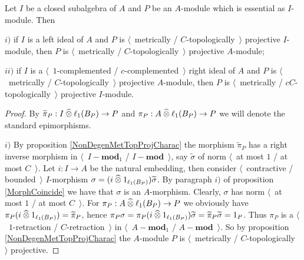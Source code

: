 \begin{proposition}\label{MetTopProjUnderChangeOfAlg} Let $I$ be a closed subalgebra of $A$ and $P$ be an $A$-module which is essential as $I$-module. Then

$i)$ if $I$ is a left ideal of $A$ and $P$ is $\langle$~metrically / $C$-topologically~$\rangle$  projective $I$-module, then $P$ is $\langle$~metrically / $C$-topologically~$\rangle$ projective $A$-module;

$ii)$ if $I$ is a $\langle$~$1$-complemented / $c$-complemented~$\rangle$ right ideal of $A$ and $P$ is $\langle$~metrically / $C$-topologically~$\rangle$ projective $A$-module, then $P$ is $\langle$~metrically / $cC$-topologically~$\rangle$ projective $I$-module.
\end{proposition}
\begin{proof} By $\widetilde{\pi}_P: I\mathbin{\widehat{\otimes}} \ell_1(B_P)\to P$ and $\pi_P:A\mathbin{\widehat{\otimes}} \ell_1(B_P)\to P$ we will denote the standard epimorphisms.

$i)$ By proposition \ref{NonDegenMetTopProjCharac} the morphism $\widetilde{\pi}_P$ has a right inverse morphism in $\langle$~$I-\mathbf{mod}_1$ / $I-\mathbf{mod}$~$\rangle$, say $\widetilde{\sigma}$ of norm $\langle$~at most $1$ / at most $C$~$\rangle$. Let $i:I\to A$ be the natural embedding, then consider $\langle$~contractive / bounded~$\rangle$ $I$-morphism $\sigma=(i\mathbin{\widehat{\otimes}} 1_{\ell_1(B_P)})\widetilde{\sigma}$. By paragraph $i)$ of proposition \ref{MorphCoincide} we have that $\sigma$ is an $A$-morphism. Clearly, $\sigma$ has norm $\langle$~at most $1$ / at most $C$~$\rangle$. For $\pi_P:A\mathbin{\widehat{\otimes}} \ell_1(B_P)\to P$ we obviously have $\pi_P(i\mathbin{\widehat{\otimes}} 1_{\ell_1(B_P)})=\widetilde{\pi}_P$, hence $\pi_P\sigma=\pi_P(i\mathbin{\widehat{\otimes}} 1_{\ell_1(B_P)})\widetilde{\sigma}=\widetilde{\pi}_P\widetilde{\sigma}=1_P$. Thus $\pi_P$ is a $\langle$~$1$-retraction / $C$-retraction~$\rangle$ in $\langle$~$A-\mathbf{mod}_1$ / $A-\mathbf{mod}$~$\rangle$. So by proposition \ref{NonDegenMetTopProjCharac} the $A$-module $P$ is $\langle$~metrically / $C$-topologically~$\rangle$ projective.


\end{proof}
